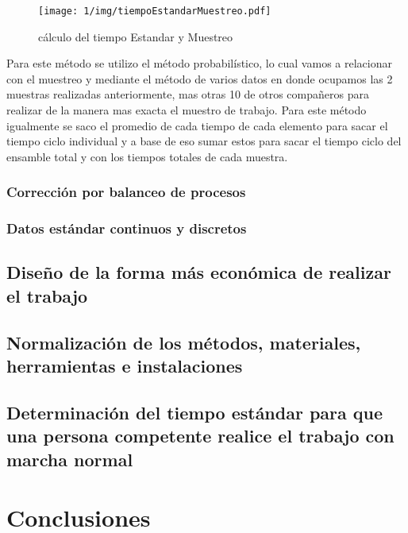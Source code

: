         \begin{figure}[H]
            \centering
            \texttt{[image: 1/img/tiempoEstandarMuestreo.pdf]}
            \caption{cálculo del tiempo Estandar y Muestreo}
            \label{fig:tiempoEstandarMuestreo}
        \end{figure}
    
    Para este método se utilizo el método probabilístico, lo cual vamos a relacionar con el muestreo y mediante el método de varios datos en donde ocupamos las 2 muestras realizadas anteriormente, mas otras 10 de otros compañeros para realizar de la manera mas exacta el muestro de trabajo. Para este método igualmente se saco el promedio de cada tiempo de cada elemento para sacar el tiempo ciclo individual y a base de eso sumar estos para sacar el tiempo ciclo del ensamble total y con los tiempos totales de cada muestra.
    \subsubsection{Corrección por balanceo de procesos}
    \subsubsection{Datos estándar continuos y discretos}
    \subsection{Diseño de la forma más económica de realizar el trabajo}
    
    \subsection{Normalización de los métodos, materiales, herramientas e instalaciones}
    
    \subsection{Determinación del tiempo estándar para que una persona competente realice el trabajo con marcha normal}
    
    
    
    
    \section{Conclusiones}
    
